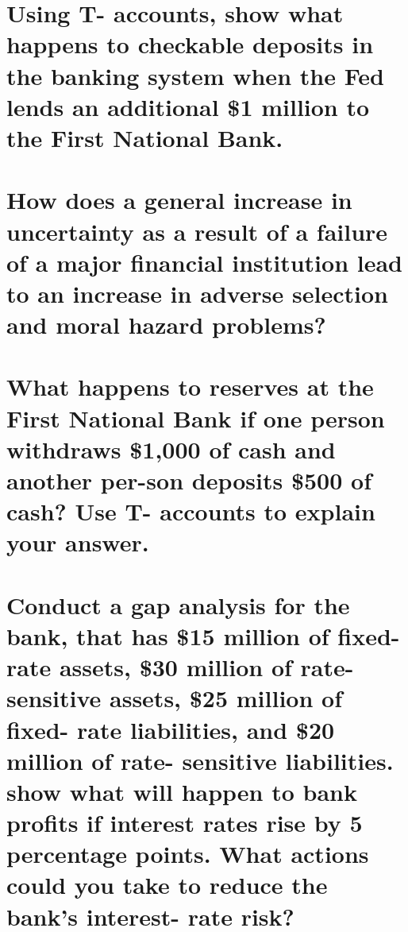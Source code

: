 \documentclass[12pt]{article}
\begin{document}
\section{Using T- accounts, show what happens to checkable deposits in the 
banking system when the Fed lends an additional \$1 million to the First 
National Bank.}

\section{How does a general increase in uncertainty as a result of a failure of 
a major financial institution lead to an increase in adverse selection and moral
hazard problems?}

\section{What happens to reserves at the First National Bank if one person 
withdraws \$1,000 of cash and another per-son deposits \$500 of cash? Use T- 
accounts to explain your answer.}

\section{Conduct a gap analysis for the bank, that has \$15 million of fixed- 
rate assets, \$30 million of rate- sensitive assets, \$25 million of fixed- rate
liabilities, and \$20 million of rate- sensitive liabilities. show what will 
happen to bank profits if interest rates rise by 5 percentage points. 
What actions could you take to reduce the bank’s interest- rate risk?}
\end{document}
